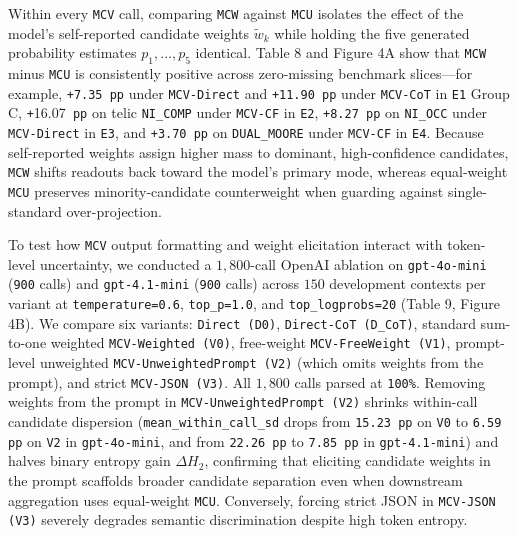 \documentclass[11pt,a4paper]{article}
\begin{document}
Within every \texttt{MCV} call, comparing \texttt{MCW} against \texttt{MCU} isolates the effect of the model's self-reported candidate weights $\tilde{w}_k$ while holding the five generated probability estimates $p_1,\dots,p_5$ identical. Table 8 and Figure 4A show that \texttt{MCW} minus \texttt{MCU} is consistently positive across zero-missing benchmark slices---for example, \texttt{+7.35 pp} under \texttt{MCV-\allowbreak{}Direct} and \texttt{+11.90 pp} under \texttt{MCV-\allowbreak{}CoT} in \texttt{E1} Group C, \texttt{+}16.07\texttt{ pp} on telic \texttt{NI\_\allowbreak{}COMP} under \texttt{MCV-\allowbreak{}CF} in \texttt{E2}, \texttt{+8.27 pp} on \texttt{NI\_\allowbreak{}OCC} under \texttt{MCV-\allowbreak{}Direct} in \texttt{E3}, and \texttt{+3.70 pp} on \texttt{DUAL\_\allowbreak{}MOORE} under \texttt{MCV-\allowbreak{}CF} in \texttt{E4}. Because self-reported weights assign higher mass to dominant, high-confidence candidates, \texttt{MCW} shifts readouts back toward the model's primary mode, whereas equal-weight \texttt{MCU} preserves minority-candidate counterweight when guarding against single-standard over-projection.

To test how \texttt{MCV} output formatting and weight elicitation interact with token-level uncertainty, we conducted a $1{,}800$-call OpenAI ablation on \texttt{gpt-\allowbreak{}4o-\allowbreak{}mini} (\texttt{900} calls) and \texttt{gpt-\allowbreak{}4.1-\allowbreak{}mini} (\texttt{900} calls) across $150$ development contexts per variant at \texttt{temperature=\allowbreak{}0.6}, \texttt{top\_\allowbreak{}p=\allowbreak{}1.0}, and \texttt{top\_\allowbreak{}logprobs=\allowbreak{}20} (Table 9, Figure 4B). We compare six variants: \texttt{Direct (D0)}, \texttt{Direct-\allowbreak{}CoT (D\_\allowbreak{}CoT)}, standard sum-to-one weighted \texttt{MCV-\allowbreak{}Weighted (V0)}, free-weight \texttt{MCV-\allowbreak{}FreeWeight (V1)}, prompt-level unweighted \texttt{MCV-\allowbreak{}UnweightedPrompt (V2)} (which omits weights from the prompt), and strict \texttt{MCV-\allowbreak{}JSON (V3)}. All $1{,}800$ calls parsed at \texttt{100\%}. Removing weights from the prompt in \texttt{MCV-\allowbreak{}UnweightedPrompt (V2)} shrinks within-call candidate dispersion (\texttt{mean\_\allowbreak{}within\_\allowbreak{}call\_\allowbreak{}sd} drops from \texttt{15.23 pp} on \texttt{V0} to \texttt{6.59 pp} on \texttt{V2} in \texttt{gpt-\allowbreak{}4o-\allowbreak{}mini}, and from \texttt{22.26 pp} to \texttt{7.85 pp} in \texttt{gpt-\allowbreak{}4.1-\allowbreak{}mini}) and halves binary entropy gain $\Delta H_2$, confirming that eliciting candidate weights in the prompt scaffolds broader candidate separation even when downstream aggregation uses equal-weight \texttt{MCU}. Conversely, forcing strict JSON in \texttt{MCV-\allowbreak{}JSON (V3)} severely degrades semantic discrimination despite high token entropy.
\end{document}
